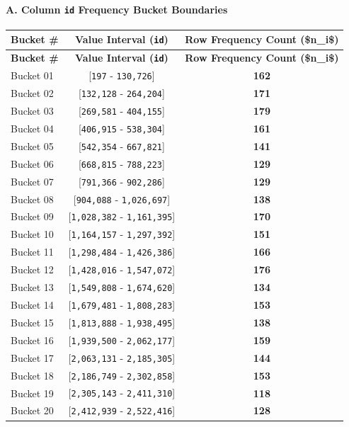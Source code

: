 \documentclass[11pt,a4paper]{article}
\begin{document}
{\paragraph{\textbf{A. Column \texttt{id} Frequency Bucket Boundaries}}
{\begingroup
\small
\setlength{\tabcolsep}{5pt}
\begin{xltabular}{\textwidth}{l | C | C}
\toprule
\textbf{Bucket \#} & \textbf{Value Interval (\texttt{id})} & \textbf{Row Frequency Count (\$n\_i\$)} \\
\midrule
\endfirsthead
\toprule
\textbf{Bucket \#} & \textbf{Value Interval (\texttt{id})} & \textbf{Row Frequency Count (\$n\_i\$)} \\
\midrule
\endfirsthead
\endhead
\bottomrule
\endfoot
\bottomrule
\endlastfoot
Bucket 01 & [\texttt{197} - \texttt{130,726}] & \textbf{162} \\
Bucket 02 & [\texttt{132,128} - \texttt{264,204}] & \textbf{171} \\
Bucket 03 & [\texttt{269,581} - \texttt{404,155}] & \textbf{179} \\
Bucket 04 & [\texttt{406,915} - \texttt{538,304}] & \textbf{161} \\
Bucket 05 & [\texttt{542,354} - \texttt{667,821}] & \textbf{141} \\
Bucket 06 & [\texttt{668,815} - \texttt{788,223}] & \textbf{129} \\
Bucket 07 & [\texttt{791,366} - \texttt{902,286}] & \textbf{129} \\
Bucket 08 & [\texttt{904,088} - \texttt{1,026,697}] & \textbf{138} \\
Bucket 09 & [\texttt{1,028,382} - \texttt{1,161,395}] & \textbf{170} \\
Bucket 10 & [\texttt{1,164,157} - \texttt{1,297,392}] & \textbf{151} \\
Bucket 11 & [\texttt{1,298,484} - \texttt{1,426,386}] & \textbf{166} \\
Bucket 12 & [\texttt{1,428,016} - \texttt{1,547,072}] & \textbf{176} \\
Bucket 13 & [\texttt{1,549,808} - \texttt{1,674,620}] & \textbf{134} \\
Bucket 14 & [\texttt{1,679,481} - \texttt{1,808,283}] & \textbf{153} \\
Bucket 15 & [\texttt{1,813,888} - \texttt{1,938,495}] & \textbf{138} \\
Bucket 16 & [\texttt{1,939,500} - \texttt{2,062,177}] & \textbf{159} \\
Bucket 17 & [\texttt{2,063,131} - \texttt{2,185,305}] & \textbf{144} \\
Bucket 18 & [\texttt{2,186,749} - \texttt{2,302,858}] & \textbf{153} \\
Bucket 19 & [\texttt{2,305,143} - \texttt{2,411,310}] & \textbf{118} \\
Bucket 20 & [\texttt{2,412,939} - \texttt{2,522,416}] & \textbf{128} \\
\end{xltabular}
\endgroup}


}
\end{document}
